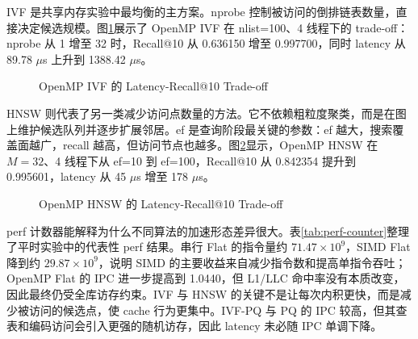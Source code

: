\documentclass[a4paper]{article}
\begin{document}
IVF 是共享内存实验中最均衡的主方案。nprobe 控制被访问的倒排链表数量，直接决定候选规模。图\ref{fig:ivf-tradeoff}展示了 OpenMP IVF 在 nlist=100、4 线程下的 trade-off：nprobe 从 1 增至 32 时，Recall@10 从 0.636150 增至 0.997700，同时 latency 从 89.78 $\mu$s 上升到 1388.42 $\mu$s。

\begin{figure}[H]
\centering
{}
\caption{OpenMP IVF 的 Latency-Recall@10 Trade-off}
\label{fig:ivf-tradeoff}
\end{figure}

HNSW 则代表了另一类减少访问点数量的方法。它不依赖粗粒度聚类，而是在图上维护候选队列并逐步扩展邻居。ef 是查询阶段最关键的参数：ef 越大，搜索覆盖面越广，recall 越高，但访问节点也越多。图\ref{fig:hnsw-tradeoff}显示，OpenMP HNSW 在 $M=32$、4 线程下从 ef=10 到 ef=100，Recall@10 从 0.842354 提升到 0.995601，latency 从 45 $\mu$s 增至 178 $\mu$s。

\begin{figure}[H]
\centering
{}
\caption{OpenMP HNSW 的 Latency-Recall@10 Trade-off}
\label{fig:hnsw-tradeoff}
\end{figure}

perf 计数器能解释为什么不同算法的加速形态差异很大。表\ref{tab:perf-counter}整理了平时实验中的代表性 perf 结果。串行 Flat 的指令量约 $71.47\times10^9$，SIMD Flat 降到约 $29.87\times10^9$，说明 SIMD 的主要收益来自减少指令数和提高单指令吞吐；OpenMP Flat 的 IPC 进一步提高到 1.0440，但 L1/LLC 命中率没有本质改变，因此最终仍受全库访存约束。IVF 与 HNSW 的关键不是让每次内积更快，而是减少被访问的候选点，使 cache 行为更集中。IVF-PQ 与 PQ 的 IPC 较高，但其查表和编码访问会引入更强的随机访存，因此 latency 未必随 IPC 单调下降。
\end{document}
